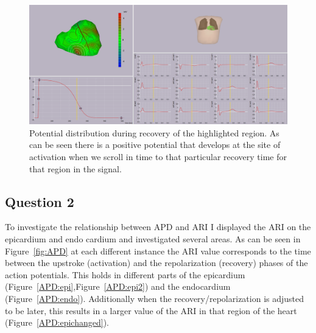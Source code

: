 \documentclass[12pt]{article}
\newcommand{\fig}[1]{Figure~\ref{#1}}
\begin{document}
\begin{figure}[H]
	
	\centering
	\includegraphics[width = .8\textwidth]{Figures/RecoPots.png}
	\caption{Potential distribution during recovery of the highlighted region. As can be seen there is a positive potential that develops at the site of activation when we scroll in time to that particular recovery time for that region in the signal.}
	\label{fig:RecT_pot}
\end{figure}

\subsection{Question 2}
To investigate the relationship between APD and ARI I displayed the ARI on the epicardium and endo cardium and investigated several areas. As can be seen in \fig{fig:APD} at each different instance the ARI value corresponds to the time between the upstroke (activation) and the repolarization (recovery) phases of the action potentials. This holds in different parts of the epicardium (\fig{APD:epi},\fig{APD:epi2}) and the endocardium (\fig{APD:endo}). Additionally when the recovery/repolarization is adjusted to be later, this results in a larger value of the ARI in that region of the heart (\fig{APD:epichanged}).
\end{document}
